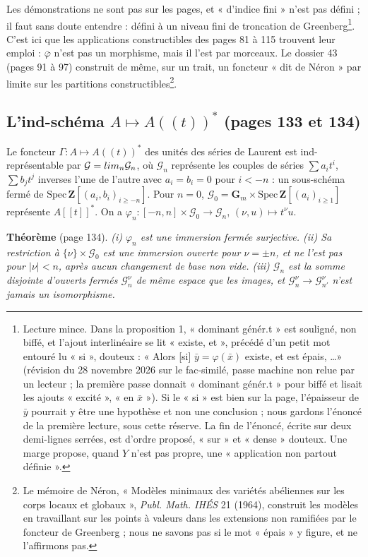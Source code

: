 \documentclass[11pt,a4paper]{article}
\begin{document}
Les démonstrations ne sont pas sur les pages, et « d'indice fini » n'est pas
défini ; il faut sans doute entendre : défini à un niveau fini de troncation de
Greenberg\footnote{Lecture mince. Dans la proposition 1, « dominant
génér.t » est souligné, non biffé, et l'ajout interlinéaire se lit « existe,
et », précédé d'un petit mot entouré lu « si », douteux : « Alors [si]
$\bar y = \varphi(\bar x)$ existe, et est épais, \ldots » (révision du 28 novembre 2026 sur le fac-similé, passe machine non relue par un lecteur ; la première
passe donnait « dominant génér.t » pour biffé et lisait les ajouts
« excité », « en $\bar x$ »). Si le « si » est bien sur la page, l'épaisseur
de $\bar y$ pourrait y être une hypothèse et non une conclusion ; nous gardons
l'énoncé de la première lecture, sous cette réserve. La fin de l'énoncé,
écrite sur deux demi-lignes serrées, est d'ordre proposé, « sur » et
« dense » douteux. Une marge propose, quand $Y$ n'est pas propre,
une « application non partout définie ».}. C'est ici que les applications
constructibles des pages 81 à 115 trouvent leur emploi : $\bar\varphi$ n'est
pas un morphisme, mais il l'est par morceaux. Le dossier 43 (pages 91 à 97)
construit de même, sur un trait, un foncteur « dit de Néron » par limite sur
les partitions constructibles\footnote{Le mémoire de Néron, « Modèles minimaux
des variétés abéliennes sur les corps locaux et globaux », \emph{Publ. Math.
IHÉS} 21 (1964), construit les modèles en travaillant sur les points à valeurs
dans les extensions non ramifiées par le foncteur de Greenberg ; nous ne
savons pas si le mot « épais » y figure, et ne l'affirmons pas.}.

\subsection*{L'ind-schéma $A \mapsto A((t))^{*}$ (pages 133 et 134)}

Le foncteur $\Gamma : A \mapsto A((t))^{*}$ des unités des séries de Laurent est
ind-représentable par $\mathcal{G} = \varinjlim_n \mathcal{G}_n$, où
$\mathcal{G}_n$ représente les couples de séries $\sum a_i t^i$, $\sum b_j t^j$
inverses l'une de l'autre avec $a_i = b_i = 0$ pour $i < -n$ : un sous-schéma
fermé de $\mathrm{Spec}\,\mathbf{Z}[(a_i, b_i)_{i \geq -n}]$. Pour $n = 0$,
$\mathcal{G}_0 = \mathbf{G}_m \times \mathrm{Spec}\,\mathbf{Z}[(a_i)_{i \geq 1}]$
représente $A[[t]]^{*}$. On a $\varphi_n : [-n, n] \times \mathcal{G}_0 \to
\mathcal{G}_n$, $(\nu, u) \mapsto t^{\nu}u$.

\textbf{Théorème} (page 134). \emph{(i) $\varphi_n$ est une immersion fermée
surjective. (ii) Sa restriction à $\{\nu\} \times \mathcal{G}_0$ est une
immersion ouverte pour $\nu = \pm n$, et ne l'est pas pour $|\nu| < n$, après
aucun changement de base non vide. (iii) $\mathcal{G}_n$ est la somme disjointe
d'ouverts fermés $\mathcal{G}_n^{\nu}$ de même espace que les images, et
$\mathcal{G}_n^{\nu} \to \mathcal{G}_{n'}^{\nu}$ n'est jamais un isomorphisme.}
\end{document}
